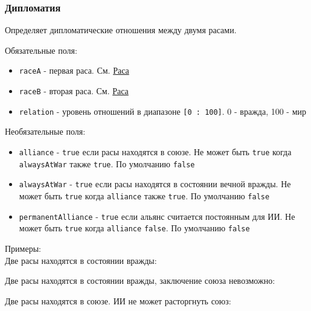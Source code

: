 \subsubsection{Дипломатия}
\label{diplomacy}
Определяет дипломатические отношения между двумя расами.

Обязательные поля:
\begin{itemize}
\item \texttt{raceA} - первая раса. См. \hyperref[raceTypes]{Раса}
\item \texttt{raceB} - вторая раса. См. \hyperref[raceTypes]{Раса}
\item \texttt{relation} - уровень отношений в диапазоне \texttt{[0 : 100]}. 0 - вражда, 100 - мир
\end{itemize}
Необязательные поля:
\begin{itemize}
\item \texttt{alliance} - \texttt{true} если расы находятся в союзе. Не может быть \texttt{true} когда \texttt{alwaysAtWar} также \texttt{true}. По умолчанию \texttt{false}
\item \texttt{alwaysAtWar} - \texttt{true} если расы находятся в состоянии вечной вражды. Не может быть \texttt{true} когда \texttt{alliance} также \texttt{true}. По умолчанию \texttt{false}
\item \texttt{permanentAlliance} - \texttt{true} если альянс считается постоянным для ИИ. Не может быть \texttt{true} когда \texttt{alliance} \texttt{false}. По умолчанию \texttt{false}
\end{itemize}

Примеры:\\
Две расы находятся в состоянии вражды:

\begin{figure}[H]

\end{figure}

Две расы находятся в состоянии вражды, заключение союза невозможно:

\begin{figure}[H]

\end{figure}

Две расы находятся в союзе. ИИ не может расторгнуть союз:

\begin{figure}[H]

\end{figure}